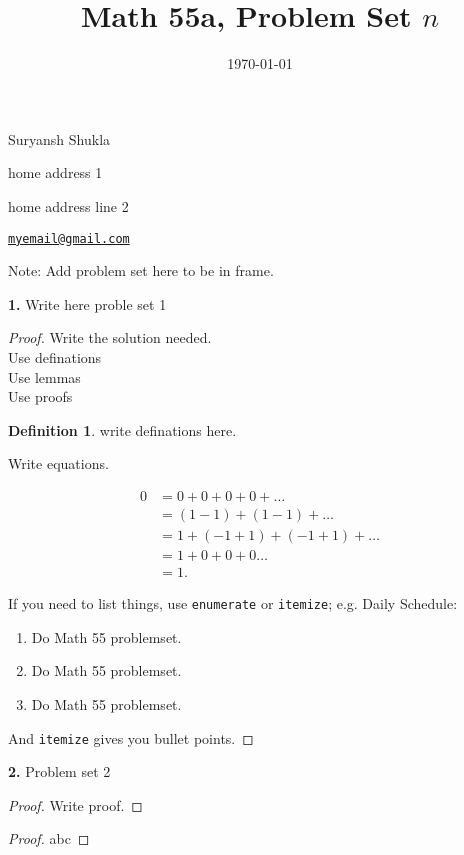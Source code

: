 \documentclass[12pt]{amsart}
\title{Math 55a, Problem Set $n$} %
\date{\today}
\newenvironment{statement}[1]{\smallskip\noindent\color[rgb]{1.00,0.00,0.50} {\bf #1.}}{}
\theoremstyle{definition}
\newtheorem{defn}[theorem]{Definition}
\theoremstyle{remark}
\begin{document}
\maketitle

\vspace*{-0.25in}
\centerline{Suryansh Shukla}
\centerline{home address 1}
\centerline{home address line 2}
\centerline{\href{myemail@gmail.com}{{\tt myemail@gmail.com}}}
\vspace*{0.15in}

\begin{framed}
  Note: Add problem set here to be in frame. 
\end{framed}

\begin{statement}{1}
    Write here proble set 1
\end{statement}

\begin{proof}
    Write the solution needed. \\
    Use definations \\
    Use lemmas \\
    Use proofs 
    \begin{defn}
    write definations here.

    \end{defn}

    Write equations.

    \begin{align*}
        0 &= 0 + 0 + 0 + 0 + \dots\\
        &= (1 - 1) + (1 - 1) + \dots \\
        &= 1 + (-1 + 1) + (-1 + 1) + \dots \\
        &= 1 + 0 + 0 + 0 \dots \\
        &= 1.
    \end{align*}

    If you need to list things, use {\tt enumerate} or {\tt itemize}; e.g. Daily Schedule:
    \begin{enumerate}
        \item Do Math 55 problemset.
        \item Do Math 55 problemset.
        \item Do Math 55 problemset.
    \end{enumerate}
    And {\tt itemize} gives you bullet points.
\end{proof}

\begin{statement}{2}
 Problem set 2
\end{statement}
\begin{proof}
   Write proof.
\end{proof}

\begin{proof}
    abc
\end{proof}
\end{document}

